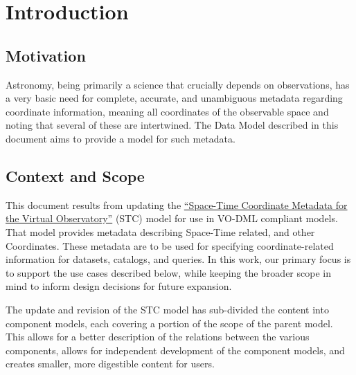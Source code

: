\documentclass[11pt,a4paper]{ivoa}
\begin{document}
\section{Introduction}

\subsection{Motivation}
Astronomy, being primarily a science that crucially depends on observations, has a very basic 
need for complete, accurate, and unambiguous metadata regarding coordinate information, meaning 
all coordinates of the observable space and noting that several of these are intertwined. The Data 
Model described in this document aims to provide a model for such metadata.

\subsection{Context and Scope}
This document results from updating the \href{http://www.ivoa.net/documents/latest/STC.html}{``Space-Time Coordinate Metadata for the Virtual Observatory''} (STC) \citep{std:STC} model for use in VO-DML compliant models. That model provides metadata describing Space-Time related, and other Coordinates. These metadata are to be used for specifying coordinate-related information for datasets, catalogs, and queries.  In this work, our primary focus is to support the use cases described below, while keeping the broader scope in mind to inform design decisions for future expansion.

The update and revision of the STC model has sub-divided the content into component models, each covering a portion of the scope of the parent model.  This allows for a better description of the relations between the various components, allows for independent development of the component models, and creates smaller, more digestible content for users.
\end{document}
